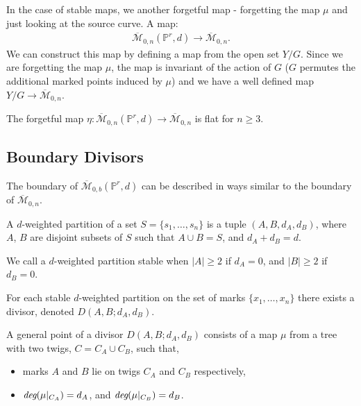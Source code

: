 \par In the case of stable maps, we another forgetful map - forgetting the map $\mu$ and just looking at the source curve. 
A map:
\begin{align*}
    \overline{\mathcal{M}}_{0,n}(\mathbb{P}^{r},d) \to \overline{\mathcal{M}}_{0,n}.
\end{align*}
We can construct this map by defining a map from the open set $Y/G$. 
Since we are forgetting the map $\mu$, the map is invariant of the action of $G$ ($G$ permutes the additional marked points induced by $\mu$) and we have a well defined map $Y/G \to \overline{\mathcal{M}}_{0,n}$.

\begin{lemma}
    The forgetful map $\eta : \overline{\mathcal{M}}_{0,n}(\mathbb{P}^{r},d) \to \overline{\mathcal{M}}_{0,n}$ is flat for $n \geq 3$.
\end{lemma}

\subsection{Boundary Divisors}

The boundary of $\mathcal{\overline{M}}_{0,b}(\mathbb{P}^{r},d)$ can be described in ways similar to the boundary of $\overline{\mathcal{M}}_{0,n}$.

\begin{definition}
    A $d$-weighted partition of a set $S = \{s_{1},\dots,s_{n}\}$ is a tuple $(A,B,d_{A},d_{B})$, where $A$, $B$ are disjoint subsets of $S$ such that $A \cup B = S$, and $d_{A} + d_{B} = d$.
    \par We call a $d$-weighted partition stable when $|A|\geq 2$ if $d_{A} = 0$, and $|B|\geq 2$ if $d_{B} = 0$.
\end{definition}

\begin{definition}
For each stable $d$-weighted partition on the set of marks $\{x_{1},\dots,x_{n}\}$ there exists a divisor, denoted $D(A,B;d_{A}, d_{B})$.
\par A general point of a divisor $D(A,B;d_{A}, d_{B})$ consists of a map $\mu$ from a tree with two twigs, $C = C_{A} \cup C_{B}$, such that,
\begin{itemize}
    \item marks $A$ and $B$ lie on twigs $C_{A}$ and $C_{B}$ respectively,
    \item $\emph{deg}(\mu|_{C_{A}}) = d_{A}$, and $\emph{deg}(\mu|_{C_{B}}) = d_{B}$.
\end{itemize}
\end{definition}

